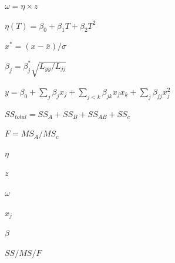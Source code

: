 
$\omega=\eta\times z$

$\eta(T)=\beta_0+\beta_1 T+\beta_2 T^2$

$x^*=(x-\bar x)/\sigma$

$\beta_j=\beta_j^*\sqrt{L_{yy}/L_{jj}}$

$y=\beta_0+\sum_j\beta_j x_j+\sum_{j<k}\beta_{jk}x_jx_k+\sum_j\beta_{jj}x_j^2$

$SS_{total}=SS_A+SS_B+SS_{AB}+SS_c$

$F=MS_A/MS_c$

$\eta$

$z$

$\omega$

$x_j$

$\beta$

$SS/MS/F$
